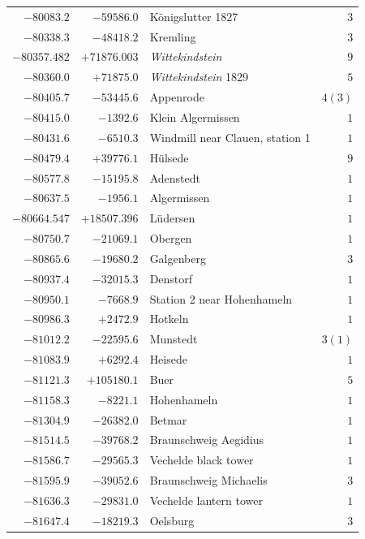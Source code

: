 \begin{center}
\begin{tabular}{r|r|p{170pt}|r}
\(-80083.2\)&\(-59586.0\)&Königslutter 1827&\(3\)\\
\(-80338.3\)&\(-48418.2\)&Kremling&\(3\)\\
\(-80357.482\)&\(+71876.003\)&\textit{Wittekindstein}&\(9\)\\
\(-80360.0\)&\(+71875.0\)&\textit{Wittekindstein} 1829&\(5\)\\
\(-80405.7\)&\(-53445.6\)&Appenrode&\(4 (3)\)\\
\(-80415.0\)&\(-1392.6\)&Klein Algermissen&\(1\)\\
\(-80431.6\)&\(-6510.3\)&Windmill near Clauen, station 1&\(1\)\\
\(-80479.4\)&\(+39776.1\)&Hülsede&\(9\)\\
\(-80577.8\)&\(-15195.8\)&Adenstedt&\(1\)\\
\(-80637.5\)&\(-1956.1\)&Algermissen&\(1\)\\
\(-80664.547\)&\(+18507.396\)&Lüdersen&\(1\)\\
\(-80750.7\)&\(-21069.1\)&Obergen&\(1\)\\
\(-80865.6\)&\(-19680.2\)&Galgenberg&\(3\)\\
\(-80937.4\)&\(-32015.3\)&Denstorf&\(1\)\\
\(-80950.1\)&\(-7668.9\)&Station 2 near Hohenhameln&\(1\)\\
\(-80986.3\)&\(+2472.9\)&Hotkeln&\(1\)\\
\(-81012.2\)&\(-22595.6\)&Munstedt&\(3 (1)\)\\
\(-81083.9\)&\(+6292.4\)&Heisede&\(1\)\\
\(-81121.3\)&\(+105180.1\)&Buer&\(5\)\\
\(-81158.3\)&\(-8221.1\)&Hohenhameln&\(1\)\\
\(-81304.9\)&\(-26382.0\)&Betmar&\(1\)\\
\(-81514.5\)&\(-39768.2\)&Braunschweig Aegidius&\(1\)\\
\(-81586.7\)&\(-29565.3\)&Vechelde black tower&\(1\)\\
\(-81595.9\)&\(-39052.6\)&Braunschweig Michaelis&\(3\)\\
\(-81636.3\)&\(-29831.0\)&Vechelde lantern tower&\(1\)\\
\(-81647.4\)&\(-18219.3\)&Oelsburg&\(3\)\\
\hline\end{tabular}\endgroup\end{center}
